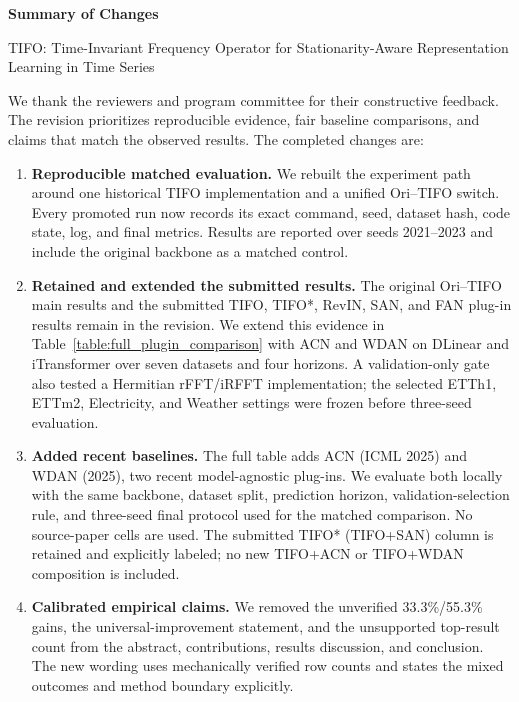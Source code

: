 \begin{center}
{\LARGE\bfseries Summary of Changes}\par
\vspace{0.5em}
{\large TIFO: Time-Invariant Frequency Operator for Stationarity-Aware Representation Learning in Time Series}
\end{center}

We thank the reviewers and program committee for their constructive feedback.
The revision prioritizes reproducible evidence, fair baseline comparisons, and
claims that match the observed results. The completed changes are:

\begin{enumerate}[leftmargin=1.6em,itemsep=0.65em]
  \item \textbf{Reproducible matched evaluation.}
  We rebuilt the experiment path around one historical TIFO implementation and
  a unified Ori--TIFO switch. Every promoted run now records its exact command,
  seed, dataset hash, code state, log, and final metrics. Results are reported
  over seeds 2021--2023 and include the original backbone as a matched control.

  \item \textbf{Retained and extended the submitted results.}
  The original Ori--TIFO main results and the submitted TIFO, TIFO*, RevIN,
  SAN, and FAN plug-in results remain in the revision. We extend this evidence
  in Table~\ref{table:full_plugin_comparison} with ACN and WDAN on DLinear and
  iTransformer over seven datasets and four horizons. A
  validation-only gate also tested a Hermitian rFFT/iRFFT implementation; the
  selected ETTh1, ETTm2, Electricity, and Weather settings were frozen before
  three-seed evaluation.

  \item \textbf{Added recent baselines.}
  The full table adds ACN (ICML 2025) and WDAN (2025), two recent
  model-agnostic plug-ins. We evaluate both locally with the same backbone,
  dataset split, prediction horizon, validation-selection rule, and three-seed
  final protocol used for the matched comparison. No source-paper cells are
  used. The submitted TIFO* (TIFO+SAN) column is retained and explicitly
  labeled; no new TIFO+ACN or TIFO+WDAN composition is included.

  \item \textbf{Calibrated empirical claims.}
  We removed the unverified 33.3\%/55.3\% gains, the universal-improvement
  statement, and the unsupported top-result count from the abstract,
  contributions, results discussion, and conclusion. The new wording uses
  mechanically verified row counts and states the mixed outcomes and method
  boundary explicitly.


\end{enumerate}
